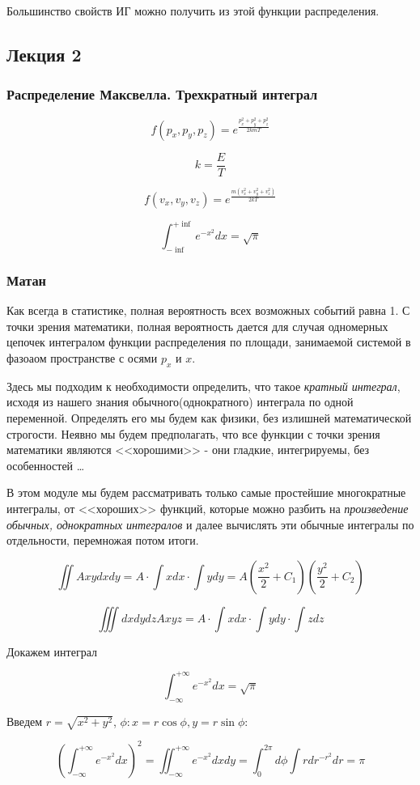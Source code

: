 \documentclass{article}
\begin{document}
Большинство свойств ИГ можно получить из этой функции распределения. 
\subsection{Лекция 2}
\subsubsection{Распределение Максвелла. Трехкратный интеграл}

$$f(p_x, p_y, p_z) = e^{\frac{p_x^2 + p_y^2 + p_z^2}{2kmT}}$$

$$k = \frac ET$$

$$f(v_x, v_y,v_z) = e^{\frac{m(v_x^2+v_y^2 + v_z^2)}{2kT}}$$

$$\int^{+\inf}_{-\inf}e^{-x^2}dx = \sqrt{\pi}$$

\subsubsection{Матан}
Как всегда в статистике, полная вероятность всех возможных событий равна 1. С точки зрения математики, полная вероятность дается для случая одномерных цепочек интегралом функции распределения по площади, занимаемой системой в фазоаом пространстве с осями $p_x$ и $x$. 

Здесь мы подходим к необходимости определить, что такое \emph{кратный интеграл}, исходя из нашего знания обычного(однократного) интеграла по одной переменной. Определять его мы будем как физики, без излишней математической строгости. Неявно мы будем предполагать, что все функции с точки зрения математики являются <<хорошими>> - они гладкие, интегрируемы, без особенностей \ldots

В этом модуле мы будем рассматривать только самые простейшие многократные интегралы, от <<хороших>> функций, которые можно разбить на \emph{произведение обычных, однократных интегралов} и далее вычислять эти обычные интегралы по отдельности, перемножая потом итоги.

$$\iint Axydxdy = A \cdot\int xdx \cdot\int ydy = A(\frac{x^2}2 + C_1)(\frac{y^2}2 + C_2)$$

$$\iiint dxdydz A x y z = A \cdot\int xdx \cdot\int ydy \cdot\int zdz $$

Докажем интеграл 

$$\int_{-\infty}^{+\infty} e^{-x^2}dx = \sqrt{\pi} $$

Введем $r = \sqrt{x^2+y^2}$, $\phi: x=r\cos\phi, y=r\sin\phi$:

$$(\int_{-\infty}^{+\infty} e^{-x^2}dx )^2 = \iint _{-\infty}^{+\infty} e^{-x^2}dxdy =  \int_{0}^{2\pi}d\phi \int r dr ^{-r^2}dr = \pi$$
\end{document}
